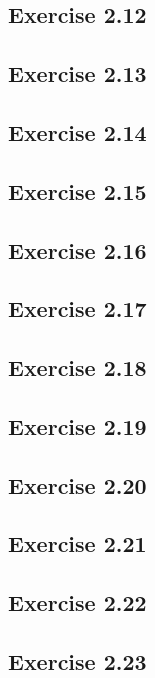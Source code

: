 \documentclass[../A&M.tex]{subfiles}
\begin{document}
\subsection*{Exercise 2.12}

\subsection*{Exercise 2.13}

\subsection*{Exercise 2.14}

\subsection*{Exercise 2.15}

\subsection*{Exercise 2.16}

\subsection*{Exercise 2.17}

\subsection*{Exercise 2.18}

\subsection*{Exercise 2.19}

\subsection*{Exercise 2.20}

\subsection*{Exercise 2.21}

\subsection*{Exercise 2.22}

\subsection*{Exercise 2.23}
\end{document}
